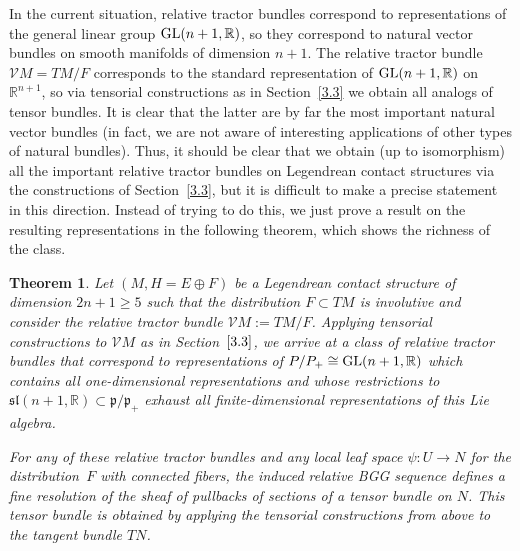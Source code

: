 \documentclass[10pt,a4paper]{amsart}
\numberwithin{equation}{section}
\newtheorem{Theorem}{Theorem}[section]
\def\frak{\mathfrak}
\def\Bbb{\mathbb}
\def\Cal{\mathcal}
\begin{document}
In the current situation, relative tractor bundles correspond to representations of
the general linear group ${\rm GL}(n+1,\Bbb R)$, so they correspond to natural vector
bundles on smooth manifolds of dimension $n+1$. The relative tractor bundle
$\Cal VM=TM/F$ corresponds to the standard representation of ${\rm GL}(n+1,\Bbb R)$ on
$\Bbb R^{n+1}$, so via tensorial constructions as in Section~\ref{3.3} we obtain all
analogs of tensor bundles. It is clear that the latter are by far the most important
natural vector bundles (in fact, we are not aware of interesting applications of
other types of natural bundles). Thus, it should be clear that we obtain (up to
isomorphism) all the important relative tractor bundles on Legendrean contact
structures via the constructions of Section~\ref{3.3}, but it is difficult to make a
precise statement in this direction. Instead of trying to do this, we just prove a
result on the resulting representations in the following theorem, which shows the
richness of the class.


\begin{Theorem}\label{thm3.4}
 Let $(M,H=E\oplus F)$ be a Legendrean contact structure of dimension ${2n+1\geq 5}$
 such that the distribution $F\subset TM$ is involutive and consider the relative
 tractor bundle $\Cal VM:=TM/F$. Applying tensorial constructions to $\Cal VM$ as in
 Section~$\ref{3.3}$, we arrive at a class of relative tractor bundles that correspond to
 representations of $P/P_+\cong {\rm GL}(n+1,\Bbb R)$ which contains all one-dimensional
 representations and whose restrictions to
 $\frak{sl}(n+1,\Bbb R)\subset\frak p/\frak p_+$ exhaust all finite-dimensional
 representations of this Lie algebra.

 For any of these relative tractor bundles and any local leaf space $\psi\colon U\to N$
 for the distribution~$F$ with connected fibers, the induced relative BGG sequence
 defines a fine resolution of the sheaf of pullbacks of sections of a tensor bundle
 on $N$. This tensor bundle is obtained by applying the tensorial constructions from
 above to the tangent bundle $TN$.
\end{Theorem}
\end{document}
